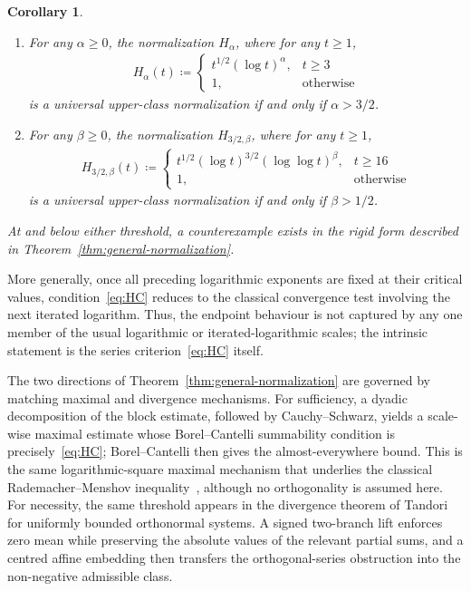 \documentclass[12pt,reqno]{amsart}
\theoremstyle{definition}
\theoremstyle{plain}
\newtheorem{cor}{Corollary}
\begin{document}
\begin{cor}
\label{cor:log-endpoint}
\begin{enumerate}[leftmargin=*]
\item For any $\alpha\geq0$, the normalization $H_\alpha$, where for any $t\geq1$,
\begin{align*}
    H_\alpha(t)
    \coloneqq
    \begin{cases}
        t^{1/2}(\log{t})^\alpha,
        &t\geq3\\
        1,
        &\text{otherwise}
    \end{cases}
\end{align*}
is a universal upper-class normalization if and only if
$\alpha>3/2$.
\item For any $\beta\geq0$, the normalization $H_{3/2,\beta}$, where for any $t\geq1$,
\begin{align*}
    H_{3/2,\beta}(t)
    \coloneqq
    \begin{cases}
        t^{1/2}(\log{t})^{3/2}(\log{\log{t}})^\beta,
        &t\geq16\\
        1,
        &\text{otherwise}
    \end{cases}
\end{align*}
is a universal upper-class normalization if and only if
$\beta>1/2$.
\end{enumerate}
At and below either threshold, a counterexample exists in the rigid form described in Theorem~\ref{thm:general-normalization}.
\end{cor}

More generally, once all preceding logarithmic exponents are fixed at their critical values, condition~\eqref{eq:HC} reduces to the classical convergence test involving the next iterated logarithm. Thus, the endpoint behaviour is not captured by any one member of the usual logarithmic or iterated-logarithmic scales; the intrinsic statement is the series criterion~\eqref{eq:HC} itself.

The two directions of Theorem~\ref{thm:general-normalization} are governed by matching maximal and divergence mechanisms. For sufficiency, a dyadic decomposition of the block estimate, followed by Cauchy--Schwarz, yields a scale-wise maximal estimate whose Borel--Cantelli summability condition is precisely~\eqref{eq:HC}; Borel--Cantelli then gives the almost-everywhere bound. This is the same logarithmic-square maximal mechanism that underlies the classical Rademacher--Menshov inequality~\cite{Rademacher1922,Menshov1923}, although no orthogonality is assumed here. For necessity, the same threshold appears in the divergence theorem of Tandori~\cite{Tandori1957I,Leindler1960} for uniformly bounded orthonormal systems. A signed two-branch lift enforces zero mean while preserving the absolute values of the relevant partial sums, and a centred affine embedding then transfers the orthogonal-series obstruction into the non-negative admissible class.
\end{document}
